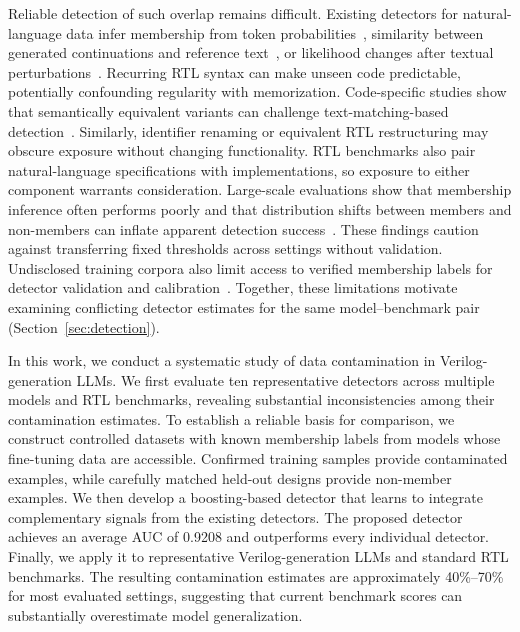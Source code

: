Reliable detection of such overlap remains difficult. Existing detectors for natural-language data infer membership from token probabilities~\cite{shi2024detecting}, similarity between generated continuations and reference text~\cite{golchin2024time}, or likelihood changes after textual perturbations~\cite{mattern2023membership}. Recurring RTL syntax can make unseen code predictable, potentially confounding regularity with memorization. Code-specific studies show that semantically equivalent variants can challenge text-matching-based detection~\cite{zhang2026syntaxaware}. Similarly, identifier renaming or equivalent RTL restructuring may obscure exposure without changing functionality. RTL benchmarks also pair natural-language specifications with implementations, so exposure to either component warrants consideration. Large-scale evaluations show that membership inference often performs poorly and that distribution shifts between members and non-members can inflate apparent detection success~\cite{duan2024membership}. These findings caution against transferring fixed thresholds across settings without validation. Undisclosed training corpora also limit access to verified membership labels for detector validation and calibration~\cite{shi2024detecting,balloccu2024leak}. Together, these limitations motivate examining conflicting detector estimates for the same model--benchmark pair (Section~\ref{sec:detection}).

In this work, we conduct a systematic study of data contamination in Verilog-generation LLMs. We first evaluate ten representative detectors across multiple models and RTL benchmarks, revealing substantial inconsistencies among their contamination estimates. To establish a reliable basis for comparison, we construct controlled datasets with known membership labels from models whose fine-tuning data are accessible. Confirmed training samples provide contaminated examples, while carefully matched held-out designs provide non-member examples. We then develop a boosting-based detector that learns to integrate complementary signals from the existing detectors. The proposed detector achieves an average AUC of 0.9208 and outperforms every individual detector. Finally, we apply it to representative Verilog-generation LLMs and standard RTL benchmarks. The resulting contamination estimates are approximately 40\%--70\% for most evaluated settings, suggesting that current benchmark scores can substantially overestimate model generalization.

